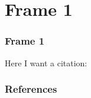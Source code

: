 \documentclass{beamer}
\begin{document}
\section{Frame 1}
\begin{frame}
\frametitle{Frame 1}
    Here I want a citation:

    \cite{Forrest2014}
\end{frame}


\begin{frame}[allowframebreaks]
\frametitle{References}
    \printbibliography
\end{frame}
\end{document}
